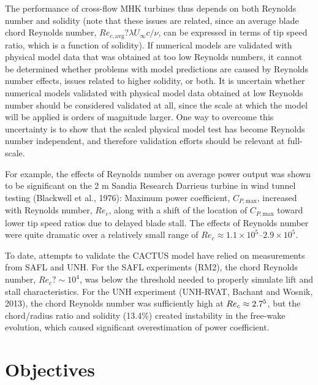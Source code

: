 \documentclass[12pt]{report}
\begin{document}
The performance of cross-flow MHK turbines thus depends on both Reynolds number
and solidity (note that these issues are related, since an average blade chord
Reynolds number, $Re_{c,\mathrm{avg}}?\lambda U_\infty c/ \nu$, can be expressed
in terms of tip speed ratio, which is a function of solidity). If numerical
models are validated with physical model data that was obtained at too low
Reynolds numbers, it cannot be determined whether problems with model
predictions are caused by Reynolds number effects, issues related to higher
solidity, or both.  It is uncertain whether numerical models validated with
physical model data obtained at low Reynolds number should be considered
validated at all, since the scale at which the model will be applied is orders
of magnitude larger. One way to overcome this uncertainty is to show that the
scaled physical model test has become Reynolds number independent, and therefore
validation efforts should be relevant at full-scale.

For example, the effects of Reynolds number on average power output was shown to
be significant on the 2 m Sandia Research Darrieus turbine in wind tunnel
testing (Blackwell et al., 1976): Maximum power coefficient,
$C_{P,\mathrm{max}}$, increased with Reynolds number, $Re_c$, along with a shift
of the location of $C_{P,\mathrm{max}}$ toward lower tip speed ratios due to
delayed blade stall. The effects of Reynolds number were quite dramatic over a
relatively small range of $Re_c \approx 1.1 \times 10^5$--$2.9 \times 10^5$.

To date, attempts to validate the CACTUS model have relied on measurements from
SAFL and UNH.  For the SAFL experiments (RM2), the chord Reynolds number,
$Re_c?\sim 10^4$, was below the threshold needed to properly simulate lift and
stall characteristics.  For the UNH experiment (UNH-RVAT, Bachant and Wosnik,
2013), the chord Reynolds number was sufficiently high at $Re_c \approx 2.7
\time 0^5$, but the chord/radius ratio and solidity (13.4\%) created instability
in the free-wake evolution, which caused significant overestimation of power
coefficient.


\section{Objectives}
\end{document}
